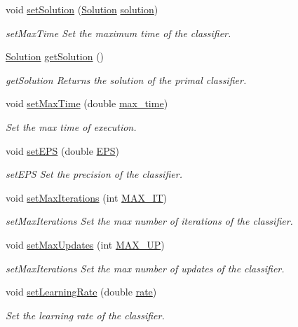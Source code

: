 \begin{DoxyCompactItemize}
void \hyperlink{class_classifier_aef6cb633eed60712f8948a404f630e82}{set\+Solution} (\hyperlink{class_solution}{Solution} \hyperlink{class_classifier_a8e70651d36fa396f55028847acd6ae50}{solution})
\begin{DoxyCompactList}\small\item\em set\+Max\+Time Set the maximum time of the classifier. \end{DoxyCompactList}\item 
\hyperlink{class_solution}{Solution} \hyperlink{class_classifier_afd2b54ada10af9f4be1c4d326b180dc7}{get\+Solution} ()
\begin{DoxyCompactList}\small\item\em get\+Solution Returns the solution of the primal classifier. \end{DoxyCompactList}\item 
void \hyperlink{class_classifier_a5da324a0de94b7171484f3b1f1f22fbd}{set\+Max\+Time} (double \hyperlink{class_classifier_a191089f044af0f4dd51f37aaff78d8f6}{max\+\_\+time})
\begin{DoxyCompactList}\small\item\em Set the max time of execution. \end{DoxyCompactList}\item 
void \hyperlink{class_classifier_a9cc5a1d92243f9d9b530347be1ac7367}{set\+E\+PS} (double \hyperlink{class_classifier_ad7cd0cfea68461340df2adb0c132dc93}{E\+PS})
\begin{DoxyCompactList}\small\item\em set\+E\+PS Set the precision of the classifier. \end{DoxyCompactList}\item 
void \hyperlink{class_classifier_a58540f77a22c0f1774d0089fac713498}{set\+Max\+Iterations} (int \hyperlink{class_classifier_a9cab88ab4489d771256bffb1717c1644}{M\+A\+X\+\_\+\+IT})
\begin{DoxyCompactList}\small\item\em set\+Max\+Iterations Set the max number of iterations of the classifier. \end{DoxyCompactList}\item 
void \hyperlink{class_classifier_ad8930d5e6002299bdb840d4542229f02}{set\+Max\+Updates} (int \hyperlink{class_classifier_abb8b95854801151e78a1d9f6a2173c22}{M\+A\+X\+\_\+\+UP})
\begin{DoxyCompactList}\small\item\em set\+Max\+Iterations Set the max number of updates of the classifier. \end{DoxyCompactList}\item 
void \hyperlink{class_classifier_a8f6818bd403afbb46d1bfd75c9731ab6}{set\+Learning\+Rate} (double \hyperlink{class_classifier_af9867e5919742de1303dd971a9a1c19a}{rate})
\begin{DoxyCompactList}\small\item\em Set the learning rate of the classifier. \end{DoxyCompactList}\end{DoxyCompactItemize}
